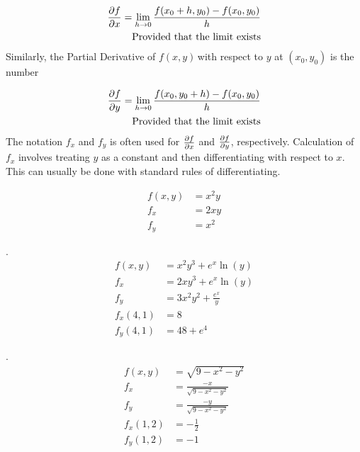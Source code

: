 \documentclass{article}
\newcommand{\n}{\leavevmode \newline} %
\newcommand{\nn}{\leavevmode \newline \newline} %
\newcommand{\fxy}{$f(x,y)\,$} %
\numberwithin{equation}{subsection} %
\begin{document}
\begin{equation}
    \begin{split}
        \pdv{f}{x}(x_0,y_0)=\lim_{h\to0}\frac{f(x_0+h,y_0)-f(x_0,y_0)}{h}\\
        \text{Provided that the limit exists}
    \end{split}
\end{equation}
\n
Similarly, the Partial Derivative of \fxy with respect to $y$ at $(x_0,y_0)$ is the number

\begin{equation}
    \begin{split}
        \pdv{f}{y}(x_0,y_0)=\lim_{h\to0}\frac{f(x_0,y_0+h)-f(x_0,y_0)}{h}\\
        \text{Provided that the limit exists}
    \end{split}
\end{equation}
\n
The notation $f_x$ and $f_y$ is often used for $\pdv{f}{x}$ and $\pdv{f}{y}$, respectively.
\nn
Calculation of $f_x$ involves treating $y$ as a constant and then differentiating with respect to $x$. This can usually be done with standard rules of differentiating.

\begin{equation}
    \begin{split}
        f(x,y)&=x^2y\\
        f_x&=2xy\\
        f_y&=x^2
    \end{split}
\end{equation}

.
\begin{equation}
    \begin{split}
        f(x,y)&=x^2y^3+e^x\ln(y)\\
        f_x&=2xy^3+e^x\ln(y)\\
        f_y&=3x^2y^2+\frac{e^x}{y}\\
        f_x(4,1)&=8\\
        f_y(4,1)&=48+e^4
    \end{split}
\end{equation}

.
\begin{equation}
    \begin{split}
        f(x,y)&=\sqrt{9-x^2-y^2}\\
        f_x&=\frac{-x}{\sqrt{9-x^2-y^2}}\\
        f_y&=\frac{-y}{\sqrt{9-x^2-y^2}}\\
        f_x(1,2)&=-\frac{1}{2}\\
        f_y(1,2)&=-1
    \end{split}
\end{equation}
\end{document}
